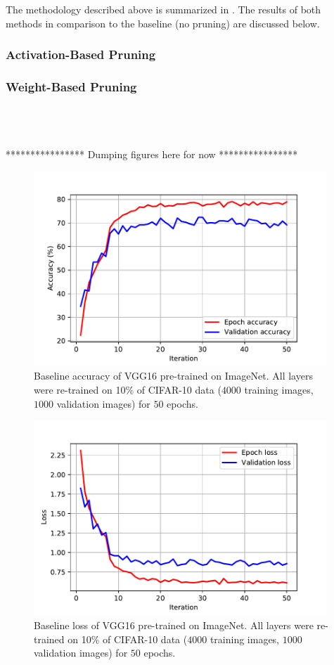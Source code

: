 \documentclass{article}
\begin{document}
The methodology described above is summarized in .
The results of both methods in comparison to the baseline (no pruning) are discussed below.

\subsubsection{Activation-Based Pruning}


\subsubsection{Weight-Based Pruning}

\ \\ 
\ \\
\ \\
**************** Dumping figures here for now ****************

\begin{figure}[!t]
	\centering
	\includegraphics[width=11cm]{./results/baseline_pre_out_1_in_50_cifar10_10percent_acc.pdf}
	\caption{Baseline accuracy of VGG16 pre-trained on ImageNet. All layers were re-trained on 10\% of CIFAR-10 data ($4000$ training images, $1000$ validation images) for $50$ epochs.}
\end{figure}

\begin{figure}[!t]
	\centering
	\includegraphics[width=11cm]{./results/baseline_pre_out_1_in_50_cifar10_10percent_loss.pdf}
	\caption{Baseline loss of VGG16 pre-trained on ImageNet. All layers were re-trained on 10\% of CIFAR-10 data ($4000$ training images, $1000$ validation images) for $50$ epochs.}
\end{figure}
\end{document}
